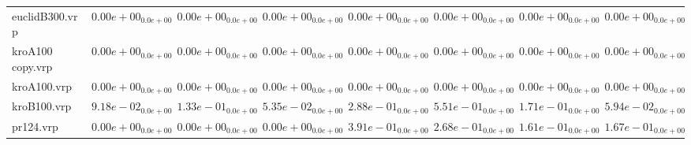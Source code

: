 \documentclass{article}
\begin{document}
\begin{table}
\begin{scriptsize}
\begin{tabular}{llllllll}
euclidB300.vrp & $  0.00e+00_{ 0.0e+00}$ & $  0.00e+00_{ 0.0e+00}$ & $  0.00e+00_{ 0.0e+00}$ & $  0.00e+00_{ 0.0e+00}$ & $  0.00e+00_{ 0.0e+00}$ & $  0.00e+00_{ 0.0e+00}$ & $  0.00e+00_{ 0.0e+00}$ \\
kroA100 copy.vrp & $  0.00e+00_{ 0.0e+00}$ & $  0.00e+00_{ 0.0e+00}$ & $  0.00e+00_{ 0.0e+00}$ & $  0.00e+00_{ 0.0e+00}$ & $  0.00e+00_{ 0.0e+00}$ & $  0.00e+00_{ 0.0e+00}$ & $  0.00e+00_{ 0.0e+00}$ \\
kroA100.vrp & $  0.00e+00_{ 0.0e+00}$ & $  0.00e+00_{ 0.0e+00}$ & $  0.00e+00_{ 0.0e+00}$ & $  0.00e+00_{ 0.0e+00}$ & $  0.00e+00_{ 0.0e+00}$ & $  0.00e+00_{ 0.0e+00}$ & $  0.00e+00_{ 0.0e+00}$ \\
kroB100.vrp & $  9.18e-02_{ 0.0e+00}$ & $  1.33e-01_{ 0.0e+00}$ & $  5.35e-02_{ 0.0e+00}$ & \cellcolor{gray25}$  2.88e-01_{ 0.0e+00}$ & \cellcolor{gray95}$  5.51e-01_{ 0.0e+00}$ & $  1.71e-01_{ 0.0e+00}$ & $  5.94e-02_{ 0.0e+00}$ \\
pr124.vrp & $  0.00e+00_{ 0.0e+00}$ & $  0.00e+00_{ 0.0e+00}$ & $  0.00e+00_{ 0.0e+00}$ & \cellcolor{gray95}$  3.91e-01_{ 0.0e+00}$ & \cellcolor{gray25}$  2.68e-01_{ 0.0e+00}$ & $  1.61e-01_{ 0.0e+00}$ & $  1.67e-01_{ 0.0e+00}$ \\
\hline
\end{tabular}
\end{scriptsize}
\end{table}
\end{document}
